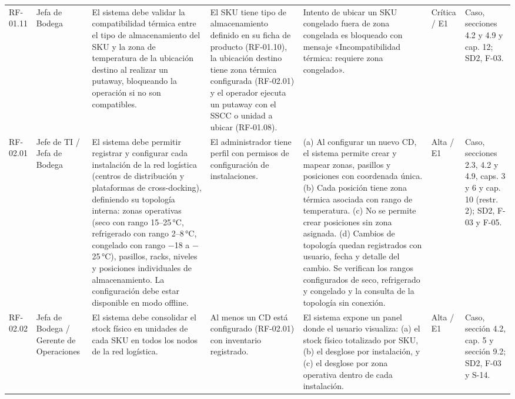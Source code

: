 {\begin{longtable}{@{}F{0.062} F{0.080} F{0.195} F{0.160} F{0.240} F{0.093} F{0.170}@{}}
  RF-01.11 & Jefa de Bodega & El sistema debe validar la compatibilidad térmica entre el tipo de almacenamiento del SKU y la zona de temperatura de la ubicación destino al realizar un putaway, bloqueando la operación si no son compatibles. & El SKU tiene tipo de almacenamiento definido en su ficha de producto (RF-01.10), la ubicación destino tiene zona térmica configurada (RF-02.01) y el operador ejecuta un putaway con el SSCC o unidad a ubicar (RF-01.08). & Intento de ubicar un SKU congelado fuera de zona congelada es bloqueado con mensaje «Incompatibilidad térmica: requiere zona congelado». & Crítica / E1 & Caso, secciones 4.2 y 4.9 y cap. 12; SD2, F-03. \\
  RF-02.01 & Jefe de TI / Jefa de Bodega & El sistema debe permitir registrar y configurar cada instalación de la red logística (centros de distribución y plataformas de cross-docking), definiendo su topología interna: zonas operativas (seco con rango 15–25\,°C, refrigerado con rango 2–8\,°C, congelado con rango $-$18 a $-$25\,°C), pasillos, racks, niveles y posiciones individuales de almacenamiento. La configuración debe estar disponible en modo offline. & El administrador tiene perfil con permisos de configuración de instalaciones. & (a) Al configurar un nuevo CD, el sistema permite crear y mapear zonas, pasillos y posiciones con coordenada única. (b) Cada posición tiene zona térmica asociada con rango de temperatura. (c) No se permite crear posiciones sin zona asignada. (d) Cambios de topología quedan registrados con usuario, fecha y detalle del cambio. Se verifican los rangos configurados de seco, refrigerado y congelado y la consulta de la topología sin conexión. & Alta / E1 & Caso, secciones 2.3, 4.2 y 4.9, caps. 3 y 6 y cap. 10 (restr. 2); SD2, F-03 y F-05. \\
  RF-02.02 & Jefa de Bodega / Gerente de Operaciones & El sistema debe consolidar el stock físico en unidades de cada SKU en todos los nodos de la red logística. & Al menos un CD está configurado (RF-02.01) con inventario registrado. & El sistema expone un panel donde el usuario visualiza: (a) el stock físico totalizado por SKU, (b) el desglose por instalación, y (c) el desglose por zona operativa dentro de cada instalación. & Alta / E1 & Caso, sección 4.2, cap. 5 y sección 9.2; SD2, F-03 y S-14. \\

\end{longtable}}
